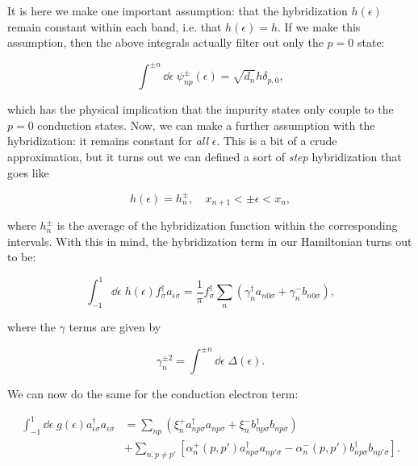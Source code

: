 It is here we make one important assumption: that the hybridization $h(\epsilon)$ remain constant within each band, i.e. that $h(\epsilon) = h$. If we make this assumption, then the above integrals actually filter out only the $p=0$ state:

\begin{equation}
  \int^{\pm n}\dd\epsilon \; \psi^{\pm}_{np}(\epsilon) = \sqrt{d_n}h\delta_{p,0},
\end{equation}

which has the physical implication that the impurity states only couple to the $p=0$ conduction states. Now, we can make a further assumption with the hybridization: it remains constant for \textit{all} $\epsilon$. This is a bit of a crude approximation, but it turns out we can defined a sort of \textit{step} hybridization that goes like

\begin{equation}
  h(\epsilon) = h_n^{\pm},\quad x_{n+1} < \pm\epsilon < x_n,
\end{equation}

where $h^{\pm}_n$ is the average of the hybridization function within the corresponding intervals. With this in mind, the hybridization term in our Hamiltonian turns out to be:

\begin{equation}
  \int_{-1}^1\dd\epsilon \; h(\epsilon) f^\dagger_{\sigma}a_{\epsilon\sigma} = \frac{1}{\pi}f^\dagger_\sigma \sum_n \left( \gamma^\dagger_n a_{n0\sigma} + \gamma^-_n b_{n0\sigma} \right),
\end{equation}

where the $\gamma$ terms are given by

\begin{equation}
  \gamma^{\pm2}_n = \int^{\pm n}\dd\epsilon \; \Delta(\epsilon).
\end{equation}

We can now do the same for the conduction electron term:

\begin{align}
  \int_{-1}^1 \dd\epsilon \; g(\epsilon) a^\dagger_{\epsilon\sigma}a_{\epsilon\sigma} &= \sum_{np} \left( \xi^+_n a^\dagger_{np\sigma}a_{np\sigma} + \xi^-_n b^\dagger_{np\sigma}b_{np\sigma} \right) \\
                                                                                      &+ \sum_{n,p \neq p'}\left[ \alpha^+_n(p,p')a^\dagger_{np\sigma}a_{np'\sigma} - \alpha^-_n(p,p')b^\dagger_{np\sigma}b_{np'\sigma} \right].\label{eq:cond-elect-exact}
\end{align}

